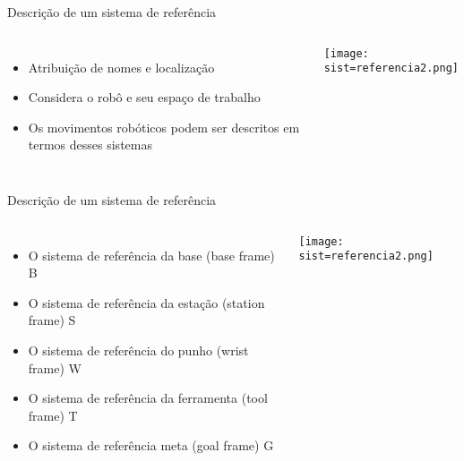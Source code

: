 \begin{frame}[c]{Descrição de um sistema de referência}
    \begin{columns}
        \begin{itemize}
            \item Atribuição de nomes e localização
            \item Considera o robô e seu espaço de trabalho
            \item Os movimentos robóticos podem ser descritos em termos desses sistemas
        \end{itemize}
            \centering
            \texttt{[image: sist=referencia2.png]}
    \end{columns}
\end{frame}
\begin{frame}[c]{Descrição de um sistema de referência}
    \begin{columns}
        \begin{itemize}
            \item O sistema de referência da base (base frame) {B}
            \item O sistema de referência da estação (station frame) {S}
            \item O sistema de referência do punho (wrist frame) {W}
            \item O sistema de referência da ferramenta (tool frame) {T}
            \item O sistema de referência meta (goal frame) {G}
        \end{itemize}
            \centering
            \texttt{[image: sist=referencia2.png]}
    \end{columns}
\end{frame}
